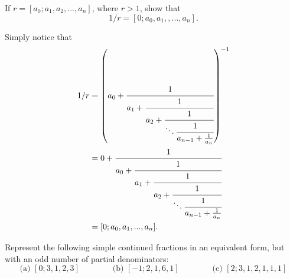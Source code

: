 \begin{exercise}
    If $r = [a_0; a_1, a_2, ..., a_n]$, where $r > 1$, show that
    $$1/r = [0; a_0, a_1,, ..., a_n].$$
\end{exercise}

\begin{solution}
    Simply notice that
    \begin{align*}
        1/r &= \left(a_0 + \cfrac{1}{
            a_1 + \cfrac{1}{
                a_2 + \cfrac{1}{
                    \ddots \cfrac{1}{
                        a_{n-1} + \frac{1}{a_n}}
                }
            }
        }\right)^{-1} \\
        &= 0 + \cfrac{1}{
            a_0 + \cfrac{1}{
                a_1 + \cfrac{1}{
                    a_2 + \cfrac{1}{
                        \ddots \cfrac{1}{
                            a_{n-1} + \frac{1}{a_n}}
                    }
                }
            }
        } \\
        &= [0; a_0, a_1, ..., a_n]. \\
    \end{align*}
\end{solution}

\begin{exercise}
    Represent the following simple continued fractions in an equivalent form, but with an odd number of partial denominators:
    $$\text{(a) } [0; 3, 1, 2, 3] \qquad \qquad \text{(b) } [-1; 2, 1, 6, 1] \qquad \qquad \text{(c) } [2; 3, 1, 2, 1, 1, 1]$$
\end{exercise}


